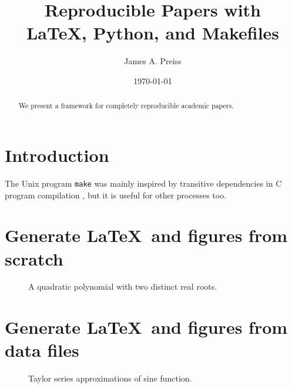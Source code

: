 \documentclass{article}
\title{Reproducible Papers with\\ \LaTeX, Python, and Makefiles}
\author{James A. Preiss}
\date{\today}
\begin{document}
\maketitle

\begin{abstract}
    We present a framework for completely reproducible academic papers.%
\end{abstract}

\section{Introduction}

The Unix program \texttt{make} was mainly inspired by transitive dependencies in C program compilation \citep{feldman1979make},
but it is useful for other processes too.


\section{Generate \LaTeX\ and figures from scratch}



\begin{figure}[h]
    \centering
    
    \caption{A quadratic polynomial with two distinct real roots.}
\end{figure}


\section{Generate \LaTeX\ and figures from data files}

\begin{table}[h]
    \centering
    
    \caption{%
        Maximum absolute error of Taylor series for $\sin x$
        on interval $x \in [-\pi, \pi]$.
    }
\end{table}

\begin{figure}[h]
    \centering
    
    \caption{Taylor series approximations of sine function.}
\end{figure}





\end{document}
